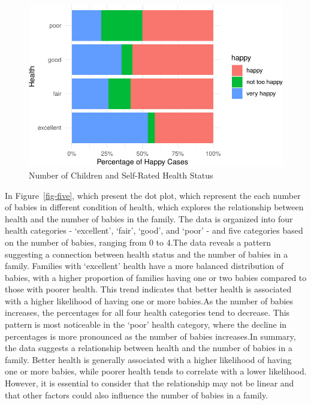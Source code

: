 \documentclass[
  letterpaper,
  DIV=11,
  numbers=noendperiod]{scrartcl}
\begin{document}
\begin{figure}

{\centering \includegraphics{paper_files/figure-pdf/fig-four-1.pdf}

}

\caption{\label{fig-four}Number of Children and Self-Rated Health
Status}

\end{figure}

In Figure~\ref{fig-five}, which present the dot plot, which represent
the each number of babies in different condition of health, which
explores the relationship between health and the number of babies in the
family. The data is organized into four health categories - `excellent',
`fair', `good', and `poor' - and five categories based on the number of
babies, ranging from 0 to 4.The data reveals a pattern suggesting a
connection between health status and the number of babies in a family.
Families with `excellent' health have a more balanced distribution of
babies, with a higher proportion of families having one or two babies
compared to those with poorer health. This trend indicates that better
health is associated with a higher likelihood of having one or more
babies.As the number of babies increases, the percentages for all four
health categories tend to decrease. This pattern is most noticeable in
the `poor' health category, where the decline in percentages is more
pronounced as the number of babies increases.In summary, the data
suggests a relationship between health and the number of babies in a
family. Better health is generally associated with a higher likelihood
of having one or more babies, while poorer health tends to correlate
with a lower likelihood. However, it is essential to consider that the
relationship may not be linear and that other factors could also
influence the number of babies in a family.
\end{document}
